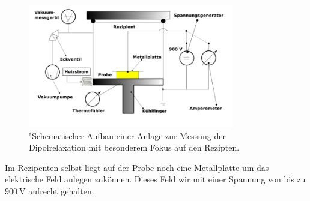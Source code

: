 \begin{figure}
    \centering
    \includegraphics[width=0.8\textwidth]{bilder/aufbau2.png}
    \caption{"Schematischer Aufbau einer Anlage zur Messung der Dipolrelaxation mit 
            besonderem Fokus auf den Rezipten.
            \cite{skript}}
    \label{fig:aufbau2}
\end{figure}


Im Rezipenten selbst liegt auf der Probe noch eine Metallplatte um das elektrische Feld anlegen zukönnen.
Dieses Feld wir mit einer Spannung von bis zu $\SI{900}{\volt}$ aufrecht gehalten.
\\
\newline

